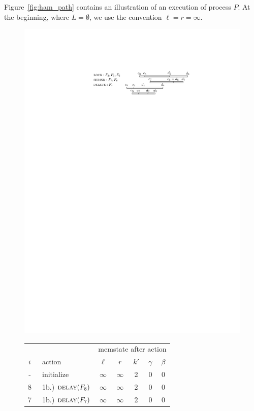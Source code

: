  Figure~\ref{fig:ham_path} contains an illustration of an execution of process $P$.
At the beginning, where $L = \emptyset$, we use the convention $\ell = r = \infty$. 
\begin{figure}
\centering
\includegraphics[scale=1]{chapter-3-interdiction/figure_ham_path}
\color{blue}
\begin{tabular}{cl|ccccc}
    && \multicolumn{5}{c}{memstate after action}\\
    $i$ & \ action & $\ell$ & $r$ & $k'$ & $\gamma$ & $\beta$ \\ 
    \hline
    - & \ initialize & $\infty$ & $\infty$ & 2 & 0 & 0 \\
    8 & \ 1b.) $\textsc{delay}(F_8)$ & $\infty$ & $\infty$ & 2 & 0 & 0\\
    7 & \ 1b.) $\textsc{delay}(F_7)$ & $\infty$ & $\infty$ & 2 & 0 & 0\\

\end{tabular}
\end{figure}
